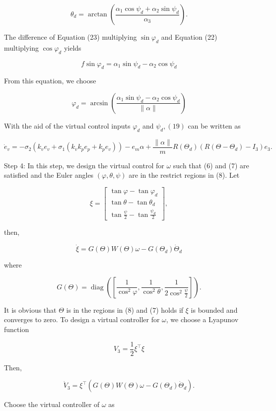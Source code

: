\documentclass[10pt]{article}
\begin{document}
$$
\theta_{d}=\arctan \left(\frac{\alpha_{1} \cos \psi_{d}+\alpha_{2} \sin \psi_{d}}{\alpha_{3}}\right) .
$$

The difference of Equation (23) multiplying $\sin \varphi_{d}$ and Equation (22) multiplying $\cos \varphi_{d}$ yields

$$
f \sin \varphi_{d}=\alpha_{1} \sin \psi_{d}-\alpha_{2} \cos \psi_{d}
$$

From this equation, we choose

$$
\varphi_{d}=\arcsin \left(\frac{\alpha_{1} \sin \psi_{d}-\alpha_{2} \cos \psi_{d}}{\|\alpha\|}\right)
$$

With the aid of the virtual control inputs $\varphi_{d}$ and $\psi_{d},(19)$ can be written as

$$
\dot{e}_{v}=-\sigma_{2}\left(k_{v} e_{v}+\sigma_{1}\left(k_{v} k_{p} e_{p}+k_{p} e_{v}\right)\right)-e_{m} \alpha+\frac{\|\alpha\|}{m} R\left(\Theta_{d}\right)\left(R\left(\Theta-\Theta_{d}\right)-I_{3}\right) e_{3} .
$$

Step 4: In this step, we design the virtual control for $\omega$ such that (6) and (7) are satisfied and the Euler angles $(\varphi, \theta, \psi)$ are in the restrict regions in (8). Let

$$
\xi=\left[\begin{array}{c}
\tan \varphi-\tan \varphi_{d} \\
\tan \theta-\tan \theta_{d} \\
\tan \frac{\psi}{2}-\tan \frac{\psi_{d}}{2}
\end{array}\right],
$$

then,

$$
\dot{\xi}=G(\Theta) W(\Theta) \omega-G\left(\Theta_{d}\right) \dot{\Theta}_{d}
$$

where

$$
G(\Theta)=\operatorname{diag}\left(\left[\frac{1}{\cos ^{2} \varphi}, \frac{1}{\cos ^{2} \theta}, \frac{1}{2 \cos ^{2} \frac{\psi}{2}}\right]\right) .
$$

It is obvious that $\Theta$ is in the regions in (8) and (7) holds if $\xi$ is bounded and converges to zero. To design a virtual controller for $\omega$, we choose a Lyapunov function

$$
V_{3}=\frac{1}{2} \xi^{\top} \xi
$$

Then,

$$
\dot{V}_{3}=\xi^{\top}\left(G(\Theta) W(\Theta) \omega-G\left(\Theta_{d}\right) \dot{\Theta}_{d}\right) .
$$

Choose the virtual controller of $\omega$ as
\end{document}
